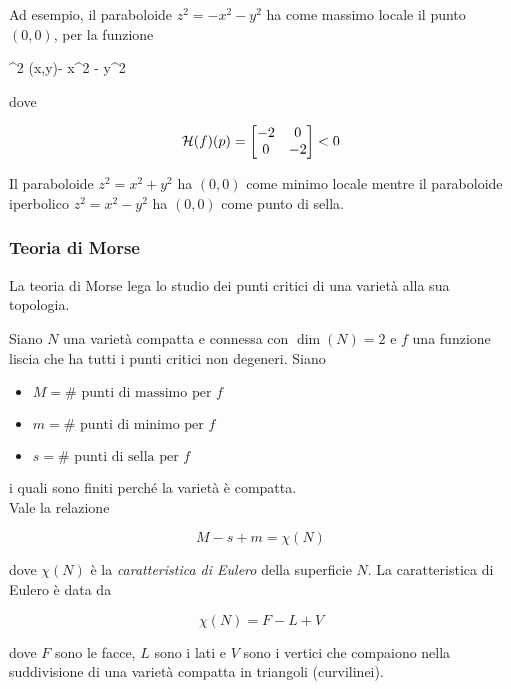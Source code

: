 Ad esempio, il paraboloide $ z^{2} = - x^{2} - y^{2} $ ha come massimo locale il punto $ (0,0) $, per la funzione

	{\R^{2}}{\R}
	{(x,y)}{- x^{2} - y^{2}}

dove

\begin{equation}
	\mathcal{H}(f)(p) = \bmqty{ -2 & 0 \\ 0 & -2 } < 0
\end{equation}

Il paraboloide $ z^{2} = x^{2} + y^{2} $ ha $ (0,0) $ come minimo locale mentre il paraboloide iperbolico $ z^{2} = x^{2} - y^{2} $ ha $ (0,0) $ come punto di sella.

\subsubsection{Teoria di Morse}

La teoria di Morse lega lo studio dei punti critici di una varietà alla sua topologia.

\begin{theorem}
	Siano $ N $ una varietà compatta e connessa con $ \dim(N)=2 $ e $ f $ una funzione liscia che ha tutti i punti critici non degeneri. Siano
	
	\begin{itemize}
		\item $ M = \# \text{ punti di massimo per } f $
		
		\item $ m = \# \text{ punti di minimo per } f $
		
		\item $ s = \# \text{ punti di sella per } f $
	\end{itemize}

	i quali sono finiti perché la varietà è compatta. \\
	Vale la relazione
	
	\begin{equation}
		M - s + m = \chi(N)
	\end{equation}

	dove $ \chi(N) $ è la \textit{caratteristica di Eulero} della superficie $ N $. La caratteristica di Eulero è data da
	
	\begin{equation}
		\chi(N) = F - L + V
	\end{equation}

	dove $ F $ sono le facce, $ L $ sono i lati e $ V $ sono i vertici che compaiono nella suddivisione di una varietà compatta in triangoli (curvilinei).
\end{theorem}

